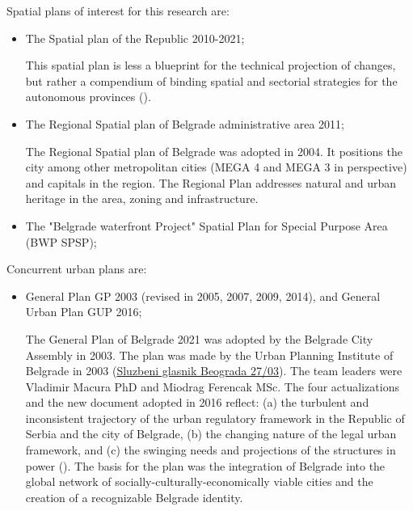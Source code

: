 \documentclass[11pt]{report}
\begin{document}
{{{{Spatial plans of interest for this research are:

\begin{itemize}
\item The Spatial plan of the Republic 2010-2021;

This spatial plan is less a blueprint for the technical projection of changes, but rather a compendium of binding spatial and sectorial strategies for the autonomous provinces (\href{Stojkov}{\citealt{stojkov_prostorno_2012}}).

\item  The Regional Spatial plan of Belgrade administrative area 2011;

The Regional Spatial plan of Belgrade was adopted in 2004.
It positions the city among other metropolitan cities (MEGA 4 and MEGA 3 in perspective) and capitals in the region.
The Regional Plan addresses natural and urban heritage in the area, zoning and infrastructure. 

\item The "Belgrade waterfront Project" Spatial Plan for Special Purpose Area (BWP SPSP);
\end{itemize}

Concurrent urban plans are:

\begin{itemize}
\item General Plan GP 2003 (revised in 2005, 2007, 2009, 2014), and General Urban Plan GUP 2016;

The  General  Plan  of  Belgrade  2021 was adopted  by the Belgrade  City Assembly in 2003.
The plan was made by  the  Urban  Planning  Institute  of  Belgrade  in  2003 (\href{ref}{Sluzbeni glasnik Beograda 27/03}). The team leaders were Vladimir Macura PhD and Miodrag Ferencak MSc. The four actualizations and the new document adopted in 2016 reflect: (a) the turbulent and inconsistent trajectory of the urban regulatory framework in the Republic of Serbia and the city of Belgrade, (b) the changing nature of the legal urban framework, and (c) the swinging needs and projections of the structures in power 
(\href{Vukmirovic}{\citealt{doytchinov_belgrade:_2015}}).
The basis for the plan was the integration of Belgrade into the global network of socially-culturally-economically viable cities and the creation of a recognizable Belgrade identity.
\\


\end{itemize}}}}}
\end{document}
